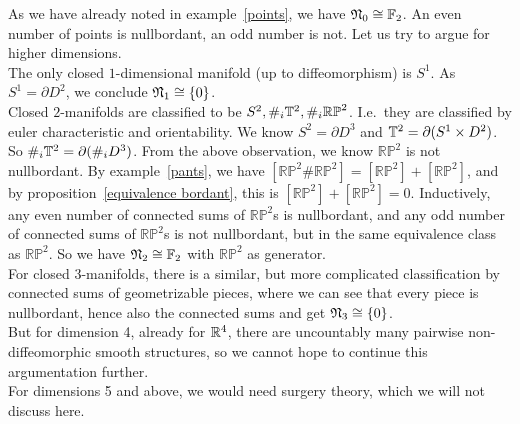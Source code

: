 \documentclass[a4paper,11pt]{article}
\begin{document}

As we have already noted in example\ \ref{points}, we have \(\mathfrak{N}_0\cong\mathbb{F}_2\). An even number of points is nullbordant, an odd number is not. Let us try to argue for higher dimensions.\\
The only closed \(1\)-dimensional manifold (up to diffeomorphism) is \(S^1\). As \(S^1=\partial D^2\), we conclude \(\mathfrak{N}_1\cong \{0\}\).\\
Closed \(2\)-manifolds are classified to be \(S^2, \#_i\mathbb{T}^2, \#_i\mathbb{RP}^2\). I.e.\ they are classified by euler characteristic and orientability. We know \(S^2=\partial D^3\) and \(\mathbb{T}^2=\partial (S^1\times D^2)\). So \(\#_i\mathbb{T}^2=\partial(\#_i D^3)\). From the above observation, we know \(\mathbb{RP}^2\) is not nullbordant. 
By example\ \ref{pants}, we have \([\mathbb{RP}^2\#\mathbb{RP}^2]=[\mathbb{RP}^2]+[\mathbb{RP}^2]\), and by proposition\ \ref{equivalence bordant}, this is \([\mathbb{RP}^2]+[\mathbb{RP}^2]=0\). Inductively, any even number of connected sums of \(\mathbb{RP}^2\)s is nullbordant, and any odd number of connected sums of \(\mathbb{RP}^2\)s is not nullbordant, but in the same equivalence class as \(\mathbb{RP}^2\). So we have \(\mathfrak{N}_2\cong\mathbb{F}_2\) with \(\mathbb{RP}^2\) as generator.\\
For closed \(3\)-manifolds, there is a similar, but more complicated classification by connected sums of geometrizable pieces, where we can see that every piece is nullbordant, hence also the connected sums and get \(\mathfrak{N}_3\cong \{0\}\).\\
But for dimension 4, already for \(\mathbb{R}^4\), there are uncountably many pairwise non-diffeomorphic smooth structures, so we cannot hope to continue this argumentation further.\\
For dimensions 5 and above, we would need surgery theory, which we will not discuss here.
\end{document}
